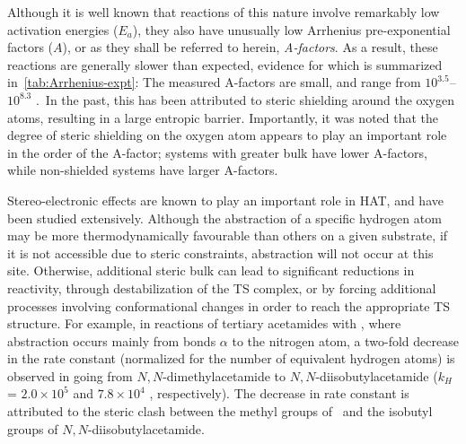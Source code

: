 
Although it is well known that reactions of this nature involve remarkably low activation energies ($E_a$),\cite{Lucarini1996, Mahoney1970a, Mahoney1975, Korcek1972} they also have unusually low Arrhenius pre-exponential factors ($A$), or as they shall be referred to herein, \emph{A-factors}. As a result, these reactions are generally slower than expected, evidence for which is summarized in~\ref{tab:Arrhenius-expt}: The measured A-factors are small, and range from $10^{3.5}$--$10^{8.3}$ \Ms.\
In the past, this has been attributed to steric shielding around the oxygen atoms, resulting in a large entropic barrier.\cite{DiLabio2005} Importantly, it was noted that the degree of steric shielding on the oxygen atom appears to play an important role in the order of the A-factor; systems with greater bulk have lower A-factors, while non-shielded systems have larger A-factors.

Stereo-electronic effects are known to play an important role in HAT, and have been studied extensively.\cite{Finn2004, Salamone2011, Pischel2001, Griller1981, Bietti2011, Salamone2012, Malatesta1982, Salamone2014} Although the abstraction of a specific hydrogen atom may be more thermodynamically favourable than others on a given substrate, if it is not accessible due to steric constraints, abstraction will not occur at this site. Otherwise, additional steric bulk can lead to significant reductions in reactivity, through destabilization of the TS complex, or by forcing additional processes involving conformational changes in order to reach the appropriate TS structure. For example, in reactions of tertiary acetamides with \cumo,\cite{Salamone2014} where abstraction occurs mainly from  bonds $\alpha$ to the nitrogen atom, a two-fold decrease in the rate constant (normalized for the number of equivalent hydrogen atoms) is observed in going from $N,N$-dimethylacetamide to $N,N$-diisobutylacetamide ($k_H$ = $2.0 \times 10^5$ and $7.8 \times 10^4$ \Ms, respectively). The decrease in rate constant is attributed to the steric clash between the methyl groups of \cumo\ and the isobutyl groups of $N,N$-diisobutylacetamide.

